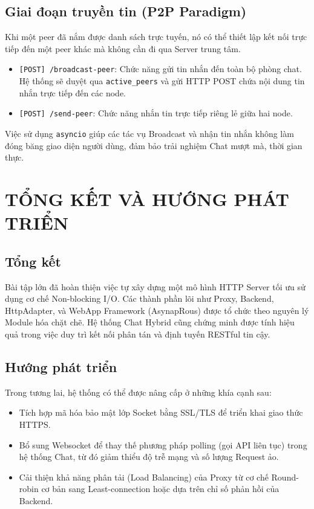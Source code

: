 \documentclass[a4paper,12pt]{article}
\begin{document}
\subsection{Giai đoạn truyền tin (P2P Paradigm)}
Khi một peer đã nắm được danh sách trực tuyến, nó có thể thiết lập kết nối trực tiếp đến một peer khác mà không cần đi qua Server trung tâm.
\begin{itemize}
    \item \texttt{[POST] /broadcast-peer}: Chức năng gửi tin nhắn đến toàn bộ phòng chat. Hệ thống sẽ duyệt qua \texttt{active\_peers} và gửi HTTP POST chứa nội dung tin nhắn trực tiếp đến các node.
    \item \texttt{[POST] /send-peer}: Chức năng nhắn tin trực tiếp riêng lẻ giữa hai node.
\end{itemize}

Việc sử dụng \texttt{asyncio} giúp các tác vụ Broadcast và nhận tin nhắn không làm đóng băng giao diện người dùng, đảm bảo trải nghiệm Chat mượt mà, thời gian thực.

\newpage
\section{TỔNG KẾT VÀ HƯỚNG PHÁT TRIỂN}

\subsection{Tổng kết}
Bài tập lớn đã hoàn thiện việc tự xây dựng một mô hình HTTP Server tối ưu sử dụng cơ chế Non-blocking I/O. Các thành phần lõi như Proxy, Backend, HttpAdapter, và WebApp Framework (AsynapRous) được tổ chức theo nguyên lý Module hóa chặt chẽ. Hệ thống Chat Hybrid cũng chứng minh được tính hiệu quả trong việc duy trì kết nối phân tán và định tuyến RESTful tin cậy.

\subsection{Hướng phát triển}
Trong tương lai, hệ thống có thể được nâng cấp ở những khía cạnh sau:
\begin{itemize}
    \item Tích hợp mã hóa bảo mật lớp Socket bằng SSL/TLS để triển khai giao thức HTTPS.
    \item Bổ sung Websocket để thay thế phương pháp polling (gọi API liên tục) trong hệ thống Chat, từ đó giảm thiểu độ trễ mạng và số lượng Request ảo.
    \item Cải thiện khả năng phân tải (Load Balancing) của Proxy từ cơ chế Round-robin cơ bản sang Least-connection hoặc dựa trên chỉ số phản hồi của Backend.
\end{itemize}
\end{document}
